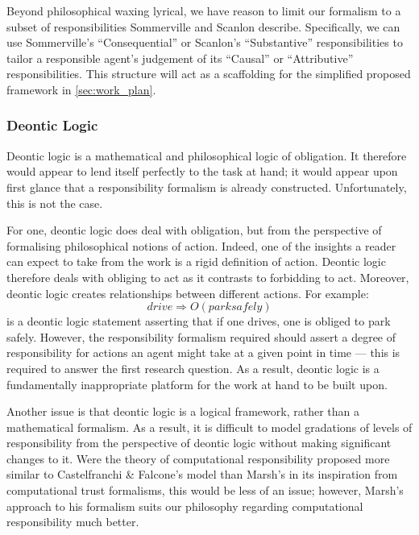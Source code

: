 Beyond philosophical waxing lyrical, we have reason to limit our formalism to a subset of responsibilities Sommerville and Scanlon describe. Specifically, we can use Sommerville's ``Consequential'' or Scanlon's ``Substantive'' responsibilities to tailor a responsible agent's judgement of its ``Causal'' or ``Attributive'' responsibilities. This structure will act as a scaffolding for the simplified proposed framework in \cref{sec:work_plan}.

\subsubsection{Deontic Logic}
Deontic logic is a mathematical and philosophical logic of obligation.\cite{deontic-logic} It therefore would appear to lend itself perfectly to the task at hand; it would appear upon first glance that a responsibility formalism is already constructed. Unfortunately, this is not the case.\par

For one, deontic logic does deal with obligation, but from the perspective of formalising philosophical notions of action. Indeed, one of the insights a reader can expect to take from the work is a rigid definition of action. Deontic logic therefore deals with obliging to act as it contrasts to forbidding to act. Moreover, deontic logic creates relationships between different actions. For example: \[drive \Rightarrow O(park safely)\] is a deontic logic statement asserting that if one drives, one is obliged to park safely. However, the responsibility formalism required should assert a degree of responsibility for actions an agent might take at a given point in time --- this is required to answer the first research question. As a result, deontic logic is a fundamentally inappropriate platform for the work at hand to be built upon.\par

Another issue is that deontic logic is a logical framework, rather than a mathematical formalism. As a result, it is difficult to model gradations of levels of responsibility from the perspective of deontic logic without making significant changes to it. Were the theory of computational responsibility proposed more similar to Castelfranchi \& Falcone's model than Marsh's in its inspiration from computational trust formalisms, this would be less of an issue; however, Marsh's approach to his formalism suits our philosophy regarding computational responsibility much better.\par

